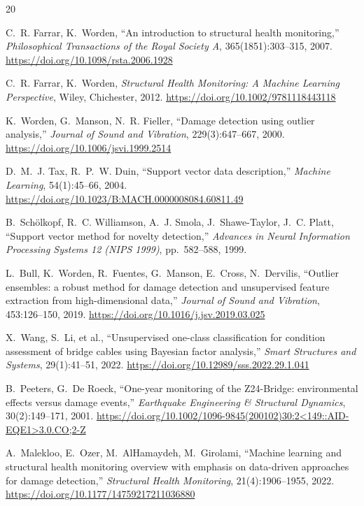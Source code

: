\documentclass[11pt,a4paper]{article}
\begin{document}
\begin{thebibliography}{20}

C.~R. Farrar, K.~Worden,
``An introduction to structural health monitoring,''
\emph{Philosophical Transactions of the Royal Society A},
365(1851):303--315, 2007.
\url{https://doi.org/10.1098/rsta.2006.1928}

C.~R. Farrar, K.~Worden,
\emph{Structural Health Monitoring: A Machine Learning Perspective},
Wiley, Chichester, 2012.
\url{https://doi.org/10.1002/9781118443118}

K.~Worden, G.~Manson, N.~R. Fieller,
``Damage detection using outlier analysis,''
\emph{Journal of Sound and Vibration}, 229(3):647--667, 2000.
\url{https://doi.org/10.1006/jsvi.1999.2514}

D.~M.~J. Tax, R.~P.~W. Duin,
``Support vector data description,''
\emph{Machine Learning}, 54(1):45--66, 2004.
\url{https://doi.org/10.1023/B:MACH.0000008084.60811.49}

B.~Sch\"olkopf, R.~C. Williamson, A.~J. Smola, J.~Shawe-Taylor, J.~C. Platt,
``Support vector method for novelty detection,''
\emph{Advances in Neural Information Processing Systems 12 (NIPS 1999)},
pp.~582--588, 1999.

L.~Bull, K.~Worden, R.~Fuentes, G.~Manson, E.~Cross, N.~Dervilis,
``Outlier ensembles: a robust method for damage detection and unsupervised
feature extraction from high-dimensional data,''
\emph{Journal of Sound and Vibration}, 453:126--150, 2019.
\url{https://doi.org/10.1016/j.jsv.2019.03.025}

X.~Wang, S.~Li, et al.,
``Unsupervised one-class classification for condition assessment of bridge
cables using Bayesian factor analysis,''
\emph{Smart Structures and Systems}, 29(1):41--51, 2022.
\url{https://doi.org/10.12989/sss.2022.29.1.041}

B.~Peeters, G.~De Roeck,
``One-year monitoring of the Z24-Bridge: environmental effects versus damage
events,''
\emph{Earthquake Engineering \& Structural Dynamics}, 30(2):149--171, 2001.
\url{https://doi.org/10.1002/1096-9845(200102)30:2<149::AID-EQE1>3.0.CO;2-Z}

A.~Malekloo, E.~Ozer, M.~AlHamaydeh, M.~Girolami,
``Machine learning and structural health monitoring overview with emphasis on
data-driven approaches for damage detection,''
\emph{Structural Health Monitoring}, 21(4):1906--1955, 2022.
\url{https://doi.org/10.1177/14759217211036880}


\end{thebibliography}
\end{document}
